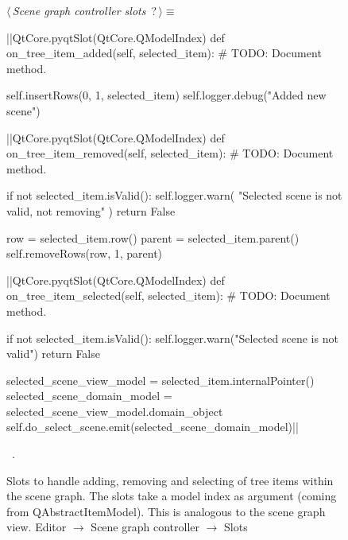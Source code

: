 \documentclass[%
    a4paper,    %
    justified,  %
    nobib,      %
    openany     %
]{tufte-book}
\makeatletter
\renewcommand{\label}[1]{\@tufte@label{##1}}%
\makeatother
\begin{document}
\begin{figure}
\begin{flushleft} \small
\begin{minipage}{\linewidth}\label{scrap50}\raggedright\small
{} $\langle\,${\itshape Scene graph controller slots}\nobreak\ {\footnotesize {?}}$\,\rangle\equiv$
\vspace{-1ex}
\begin{pythoncode}
|\normalfont{}\fontfamily{}|QtCore.pyqtSlot(QtCore.QModelIndex)
def on_tree_item_added(self, selected_item):
    # TODO: Document method.

    self.insertRows(0, 1, selected_item)
    self.logger.debug("Added new scene")

|\normalfont{}\fontfamily{}|QtCore.pyqtSlot(QtCore.QModelIndex)
def on_tree_item_removed(self, selected_item):
    # TODO: Document method.

    if not selected_item.isValid():
        self.logger.warn(
            "Selected scene is not valid, not removing"
        )
        return False

    row = selected_item.row()
    parent = selected_item.parent()
    self.removeRows(row, 1, parent)

|\normalfont{}\fontfamily{}|QtCore.pyqtSlot(QtCore.QModelIndex)
def on_tree_item_selected(self, selected_item):
    # TODO: Document method.

    if not selected_item.isValid():
        self.logger.warn("Selected scene is not valid")
        return False

    selected_scene_view_model = selected_item.internalPointer()
    selected_scene_domain_model  = selected_scene_view_model.domain_object
    self.do_select_scene.emit(selected_scene_domain_model)|\NWsep|
\end{pythoncode}
\vspace{1.5ex}
\footnotesize
\begin{list}{}{\setlength{\itemsep}{-\parsep}\setlength{\itemindent}{-\leftmargin}}
\item \NWtxtMacroRefIn\ .

\item{}
\end{list}
\end{minipage}\vspace{4ex}
\end{flushleft}
\caption{Slots to handle adding, removing and selecting of tree items within the
  scene graph. The slots take a model index as argument (coming from
  QAbstractItemModel). This is analogous to the scene graph view.
  \newline{}\newline{}Editor $\rightarrow$ Scene graph controller
  $\rightarrow$ Slots}
\label{editor:lst:scene-graph-controller:slots:on-tree-item-added-removed-selected}
\end{figure}
\end{document}
